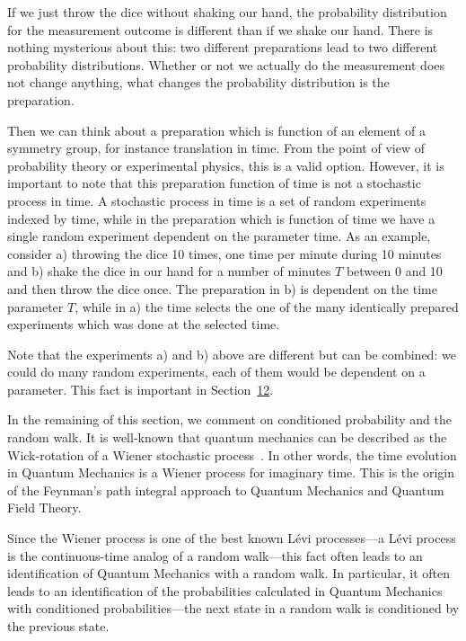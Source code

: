 \documentclass[11pt]{book}
\begin{document}
If we just throw the dice without shaking our hand, the probability
distribution for the measurement outcome is different than if we shake
our hand. There is nothing mysterious about this: two different
preparations lead to two different probability distributions. Whether or
not we actually do the measurement does not change anything, what
changes the probability distribution is the preparation.

Then we can think about a preparation which is function of an element of
a symmetry group, for instance translation in time. From the point of
view of probability theory or experimental physics, this is a valid
option. However, it is important to note that this preparation function
of time is not a stochastic process in time. A stochastic process in
time is a set of random experiments indexed by time, while in the
preparation which is function of time we have a single random experiment
dependent on the parameter time. As an example, consider a) throwing the
dice 10 times, one time per minute during 10 minutes and b) shake the
dice in our hand for a number of minutes \(T\) between 0 and 10 and then
throw the dice once. The preparation in b) is dependent on the time
parameter \(T\), while in a) the time selects the one of the many
identically prepared experiments which was done at the selected time.

Note that the experiments a) and b) above are different but can be
combined: we could do many random experiments, each of them would be
dependent on a parameter. This fact is important in
Section~\protect\hyperlink{sec:timetranslation}{12}.

In the remaining of this section, we comment on conditioned probability
and the random walk. It is well-known that quantum mechanics can be
described as the Wick-rotation of a Wiener stochastic
process~\cite{Strocchi2013introduction}. In other words, the time evolution in Quantum Mechanics is a
Wiener process for imaginary time. This is the origin of the Feynman's
path integral approach to Quantum Mechanics and Quantum Field Theory.

Since the Wiener process is one of the best known Lévi processes---a
Lévi process is the continuous-time analog of a random walk---this fact
often leads to an identification of Quantum Mechanics with a random
walk. In particular, it often leads to an identification of the
probabilities calculated in Quantum Mechanics with conditioned
probabilities---the next state in a random walk is conditioned by the
previous state.
\end{document}
